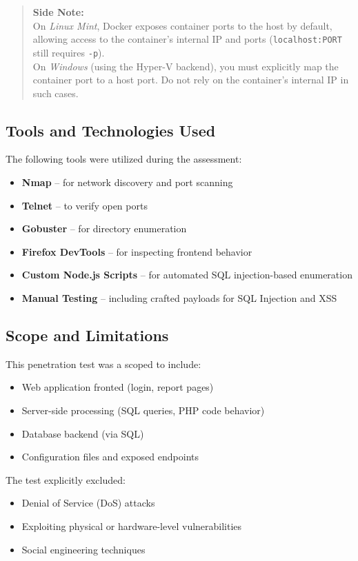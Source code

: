 \documentclass[12pt]{article}
\begin{document}
\begin{quote}
\textbf{Side Note:} \\
On \textit{Linux Mint}, Docker exposes container ports to the host by default, allowing access to the container’s internal IP and ports (\texttt{localhost:PORT} still requires \texttt{-p}). \\
On \textit{Windows} (using the Hyper-V backend), you must explicitly map the container port to a host port. Do not rely on the container’s internal IP in such cases.
\end{quote}


\subsection{Tools and Technologies Used}
The following tools were utilized during the assessment:

\begin{itemize}
  \item \textbf{Nmap} – for network discovery and port scanning
  \item \textbf{Telnet} – to verify open ports
  \item \textbf{Gobuster} – for directory enumeration
  \item \textbf{Firefox DevTools} – for inspecting frontend behavior
  \item \textbf{Custom Node.js Scripts} – for automated SQL injection-based enumeration
  \item \textbf{Manual Testing} – including crafted payloads for SQL Injection and XSS
\end{itemize}

\subsection{Scope and Limitations}
This penetration test was a scoped to include:

\begin{itemize}
  \item Web application fronted (login, report pages)
  \item Server-side processing (SQL queries, PHP code behavior)
  \item Database backend (via SQL)
  \item Configuration files and exposed endpoints
\end{itemize}

The test explicitly excluded:

\begin{itemize}
  \item Denial of Service (DoS) attacks
  \item Exploiting physical or hardware-level vulnerabilities
  \item Social engineering techniques
\end{itemize}
\end{document}
